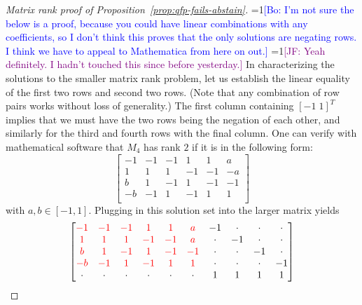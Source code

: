 \documentclass[anon]{colt2020} %
\newcommand{\Comments}{1}
\newcommand{\mynote}[2]{\ifnum\Comments=1\textcolor{#1}{#2}\fi}
\newcommand{\jessie}[1]{\mynote{purple}{[JF: #1]}}
\newcommand{\bo}[1]{\mynote{blue}{[Bo: #1]}}
\newcommand{\abstain}[1]{\mathrm{abstain}_{#1}}
\begin{document}
\begin{proof}[Matrix rank proof of Proposition~\ref{prop:qfp-fails-abstain}]
	\bo{I'm not sure the below is a proof, because you could have linear combinations with any coefficients, so I don't think this proves that the only solutions are negating rows. I think we have to appeal to Mathematica from here on out.}
	\jessie{Yeah definitely.  I hadn't touched this since before yesterday.}
	In characterizing the solutions to the smaller matrix rank problem, let us establish the linear equality of the first two rows and second two rows.
	(Note that any combination of row pairs works without loss of generality.)
	The first column containing $[-1 \; 1]^T$ implies that we must have the two rows being the negation of each other, and similarly for the third and fourth rows with the final column.
	One can verify with mathematical software that $M_4$ has rank $2$ if it is in the following form:
	\[
	\begin{bmatrix}
	-1 & -1 & -1 & 1 & 1 & a \\
	1 & 1 & 1 & -1 & -1 & -a \\
	b & 1 & -1 & 1 & -1 & -1 \\
	-b & -1 & 1 & -1 & 1 & 1 \\
	\end{bmatrix}
	\] with $a, b \in [-1,1]$.
	Plugging in this solution set into the larger matrix yields
	\[
	\begin{bmatrix}
	{\color{red} -1} & {\color{red} -1} & {\color{red} -1} & {\color{red} 1} & {\color{red} 1} & {\color{red} a} & -1 & \cdot & \cdot & \cdot \\
	{\color{red} 1} & {\color{red} 1} & {\color{red} 1} & {\color{red} -1} & {\color{red} -1} & {\color{red} a} & \cdot & -1 & \cdot & \cdot \\
	{\color{red} b} & {\color{red} 1} & {\color{red} -1} & {\color{red} 1} & {\color{red} -1} & {\color{red} -1} & \cdot & \cdot & -1 & \cdot \\
	{\color{red} -b} & {\color{red} -1} & {\color{red} 1} & {\color{red} -1} & {\color{red} 1} & {\color{red} 1} & \cdot & \cdot & \cdot & -1 \\
	\cdot & \cdot & \cdot & \cdot & \cdot & \cdot & 1 & 1 & 1 & 1\\
	\end{bmatrix}
	\]
	
\end{proof}



\end{document}
